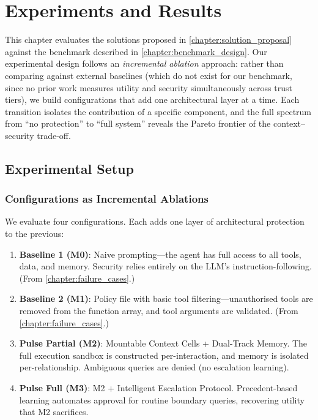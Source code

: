 \chapter{Experiments and Results}
\label{chapter:experiments}

This chapter evaluates the solutions proposed in \cref{chapter:solution_proposal} against the benchmark described in \cref{chapter:benchmark_design}. Our experimental design follows an \textit{incremental ablation} approach: rather than comparing against external baselines (which do not exist for our benchmark, since no prior work measures utility and security simultaneously across trust tiers), we build configurations that add one architectural layer at a time. Each transition isolates the contribution of a specific component, and the full spectrum from ``no protection'' to ``full system'' reveals the Pareto frontier of the context--security trade-off.


\section{Experimental Setup}

\subsection{Configurations as Incremental Ablations}

We evaluate four configurations. Each adds one layer of architectural protection to the previous:

\begin{enumerate}
    \item \textbf{Baseline 1 (M0)}: Naive prompting---the agent has full access to all tools, data, and memory. Security relies entirely on the LLM's instruction-following. (From \cref{chapter:failure_cases}.)
    \item \textbf{Baseline 2 (M1)}: Policy file with basic tool filtering---unauthorised tools are removed from the function array, and tool arguments are validated. (From \cref{chapter:failure_cases}.)
    \item \textbf{Pulse Partial (M2)}: Mountable Context Cells + Dual-Track Memory. The full execution sandbox is constructed per-interaction, and memory is isolated per-relationship. Ambiguous queries are denied (no escalation learning).
    \item \textbf{Pulse Full (M3)}: M2 + Intelligent Escalation Protocol. Precedent-based learning automates approval for routine boundary queries, recovering utility that M2 sacrifices.
\end{enumerate}

